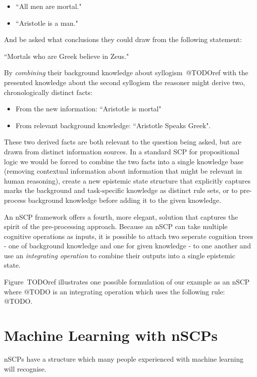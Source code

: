 \begin{itemize}
\item ``All men are mortal."
\item ``Aristotle is a man."
\end{itemize}

And be asked what conclusions they could draw from the following statement:

``Mortals who are Greek believe in Zeus."

By \textit{combining} their background knowledge about syllogism~@TODOref with the presented knowledge about the second syllogism the reasoner might derive two, chronologically distinct facts:

\begin{itemize}
\item From the new information: ``Aristotle is mortal"
\item From relevant background knowledge: ``Aristotle Speaks Greek".
\end{itemize}

These two derived facts are both relevant to the question being asked, but are drawn from distinct information sources. In a standard SCP for propositional logic we would be forced to combine the two facts into a single knowledge base (removing contextual information about information that might be relevant in human reasoning), create a new epistemic state structure that explicitly captures marks the background and task-specific knowledge as distinct rule sets, or to pre-process background knowledge before adding it to the given knowledge.

An nSCP framework offers a fourth, more elegant, solution that captures the spirit of the pre-processing approach. Because an nSCP can take multiple cognitive operations as inputs, it is possible to attach two seperate cognition trees - one of background knowledge and one for given knowledge - to one another and use an \textit{integrating operation} to combine their outputs into a single epistemic state.

Figure~TODOref illustrates one possible formulation of our example as an nSCP where @TODO is an integrating operation which uses the following rule: @TODO.

\section{Machine Learning with nSCPs}

nSCPs have a structure which many people experienced with machine learning will recognise. 
